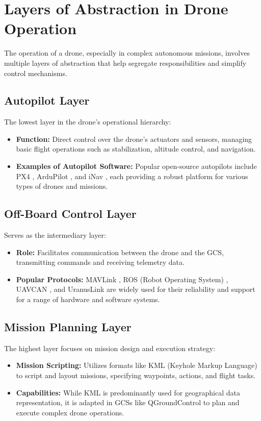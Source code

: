 \section{Layers of Abstraction in Drone Operation}

The operation of a drone, especially in complex autonomous missions, involves multiple layers of abstraction that help segregate responsibilities and simplify control mechanisms.

\subsection{Autopilot Layer}
The lowest layer in the drone’s operational hierarchy:
\begin{itemize}
    \item \textbf{Function:} Direct control over the drone's actuators and sensors, managing basic flight operations such as stabilization, altitude control, and navigation.
    \item \textbf{Examples of Autopilot Software:} Popular open-source autopilots include PX4 \cite{px4docs2023}, ArduPilot \cite{ardupilot2023}, and iNav \cite{inavflight2023}, each providing a robust platform for various types of drones and missions.
\end{itemize}

\subsection{Off-Board Control Layer}
Serves as the intermediary layer:
\begin{itemize}
    \item \textbf{Role:} Facilitates communication between the drone and the GCS, transmitting commands and receiving telemetry data.
    \item \textbf{Popular Protocols:} MAVLink \cite{mavlink2023}, ROS (Robot Operating System) \cite{rosdocs2023}, UAVCAN \cite{uavcan2023}, and UranusLink\cite{UranusLink} are widely used for their reliability and support for a range of hardware and software systems.
\end{itemize}

\subsection{Mission Planning Layer}
The highest layer focuses on mission design and execution strategy:
\begin{itemize}
    \item \textbf{Mission Scripting:} Utilizes formats like KML (Keyhole Markup Language) \cite{kmltutorial2023} to script and layout missions, specifying waypoints, actions, and flight tasks.
    \item \textbf{Capabilities:} While KML is predominantly used for geographical data representation, it is adapted in GCSs like QGroundControl \cite{qgroundcontrol2023} to plan and execute complex drone operations.
\end{itemize}

